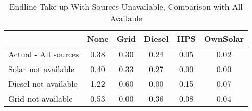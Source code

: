 \begin{table}[htbp]\centering
\caption{Endline Take-up With Sources Unavailable, Comparison with All Available\label {tab1}}
\begin{tabular}{l*{5}{c}}
\toprule
            &        None&        Grid&      Diesel&         HPS&    OwnSolar\\
\midrule
Actual - All sources&        0.38&        0.30&        0.24&        0.05&        0.02\\
Solar not available&        0.40&        0.33&        0.27&        0.00&        0.00\\
Diesel not available&        1.22&        0.60&        0.00&        0.15&        0.07\\
Grid not available&        0.53&        0.00&        0.36&        0.08&        0.04\\
\bottomrule
\end{tabular}
\end{table}
